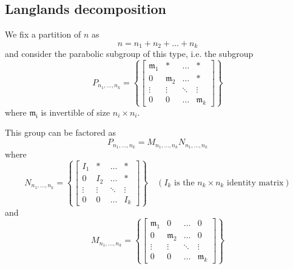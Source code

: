\documentclass[12pt]{article} %
\begin{document}
\subsection{Langlands decomposition}
We fix a partition of $n$ as
\[n=n_1+n_2+\ldots+n_k\]
and consider the parabolic subgroup of this type, i.e. the subgroup
\[P_{n_1,\ldots, n_k} = \left\lbrace \begin{bmatrix}
        \mathfrak{m}_1 & \ast           & \ldots & \ast           \\
        0              & \mathfrak{m}_2 & \ldots & \ast           \\
        \vdots         & \vdots         & \ddots & \vdots         \\
        0              & 0              & \ldots & \mathfrak{m}_k
    \end{bmatrix} \right\rbrace\]
where $\mathfrak{m_i}$ is invertible of size $n_i \times n_i$.

This group can be factored as
\[P_{n_1,\ldots, n_k} =M_{n_1,\ldots, n_k}N_{n_1,\ldots, n_k}\]
where
\[N_{n_1,\ldots, n_k} = \left\lbrace \begin{bmatrix}
        I_1    & \ast   & \ldots & \ast   \\
        0      & I_2    & \ldots & \ast   \\
        \vdots & \vdots & \ddots & \vdots \\
        0      & 0      & \ldots & I_k
    \end{bmatrix} \right\rbrace \quad \left(I_k \text{ is the $n_k\times n_k$ identity matrix}\right)\]
and
\[M_{n_1,\ldots, n_k} = \left\lbrace \begin{bmatrix}
        \mathfrak{m}_1 & 0              & \ldots & 0              \\
        0              & \mathfrak{m}_2 & \ldots & 0              \\
        \vdots         & \vdots         & \ddots & \vdots         \\
        0              & 0              & \ldots & \mathfrak{m}_k
    \end{bmatrix} \right\rbrace\]
\end{document}

